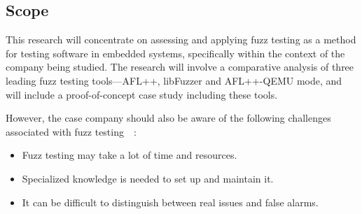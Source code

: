 \subsection{Scope}
This research will concentrate on assessing and applying fuzz testing as a
method for testing software in embedded systems, specifically within the context
of the company being studied. The research will involve a comparative analysis of three leading
fuzz testing tools—AFL++, libFuzzer and AFL++-QEMU mode, and will include a proof-of-concept
case study including these tools.

However, the case company should also be aware of the following challenges
associated with fuzz testing~\cite{liang2018fuzz}~\cite{takanen2018fuzzing}:

\begin{itemize}
      \item Fuzz testing may take a lot of time and resources.
      \item Specialized knowledge is needed to set up and maintain it.
      \item It can be difficult to distinguish between real issues and false alarms.
\end{itemize}


\clearpage

